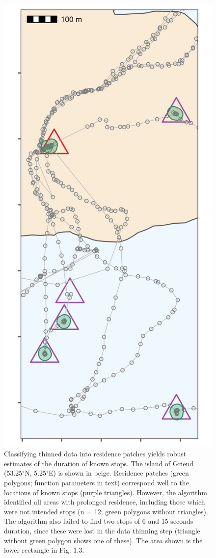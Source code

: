 \documentclass[]{scrreprt}
\begin{document}
\begin{figure}
\centering
\includegraphics{figures/fig_calib_residence.png}
\caption{Classifying thinned data into residence patches yields robust estimates of the duration of known stops. The island of Griend (53.25\(^{\circ}\)N, 5.25\(^{\circ}\)E) is shown in beige. Residence patches (green polygons; function parameters in text) correspond well to the locations of known stops (purple triangles). However, the algorithm identified all areas with prolonged residence, including those which were not intended stops (n = 12; green polygons without triangles). The algorithm also failed to find two stops of 6 and 15 seconds duration, since these were lost in the data thinning step (triangle without green polygon shows one of these). The area shown is the lower rectangle in Fig. 1.3.}
\end{figure}
\end{document}
